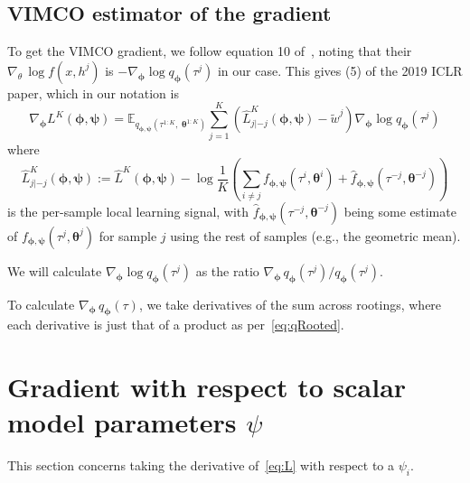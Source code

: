 \documentclass{article}
\newcommand{\bParam}{\bm{\theta}}
\begin{document}
\subsection*{VIMCO estimator of the gradient}


To get the VIMCO gradient, we follow equation 10 of~\cite{Mnih2016-ec}, noting that their $\nabla_\theta \, \log f(x, h^j)$ is $-\nabla_{\bm{\phi}} \log q_{\bm{\phi}}(\tau^j)$ in our case.
This gives (5) of the 2019 ICLR paper, which in our notation is
\[
\nabla_{\bm{\phi}} L^K(\bm{\phi},{\bm{\psi}}) = \mathbb{E}_{q_{\bm{\phi},{\bm{\psi}}}(\tau^{1:K},\;\bm{\theta}^{1:K})}\sum_{j=1}^K\left(\hat{L}_{j|-j}^K(\bm{\phi},{\bm{\psi}})-\tilde{w}^j\right)\nabla_{\bm{\phi}}\log q_{\bm{\phi}}(\tau^j)
\]
where
\[
\hat{L}_{j|-j}^K(\bm{\phi},{\bm{\psi}}) :=  \hat{L}^K(\bm{\phi},{\bm{\psi}}) - \log\frac1K\left(\sum_{i\neq j}f_{\bm{\phi},{\bm{\psi}}}(\tau^i,\bm{\theta}^i) + \hat{f}_{\bm{\phi},{\bm{\psi}}}(\tau^{-j},\bm{\theta}^{-j})\right)
\]
is the per-sample local learning signal, with $\hat{f}_{\bm{\phi},{\bm{\psi}}}(\tau^{-j},\bm{\theta}^{-j})$ being some estimate of $f_{\bm{\phi},{\bm{\psi}}}(\tau^j,\bm{\theta}^j)$ for sample $j$ using the rest of samples (e.g., the geometric mean).

We will calculate $\nabla_{\bm \phi} \log q_{\bm \phi}(\tau^j)$ as the ratio ${\nabla_{\bm \phi} \, q_{\bm{\phi}}(\tau^j)} / {q_{\bm{\phi}}(\tau^j)}$.

To calculate $\nabla_{\bm \phi} \, q_{\bm{\phi}}(\tau)$, we take derivatives of the sum across rootings, where each derivative is just that of a product as per~\eqref{eq:qRooted}.


\section*{Gradient with respect to scalar model parameters $\psi$}

This section concerns taking the derivative of~\eqref{eq:L} with respect to a $\psi_i$.
\end{document}
